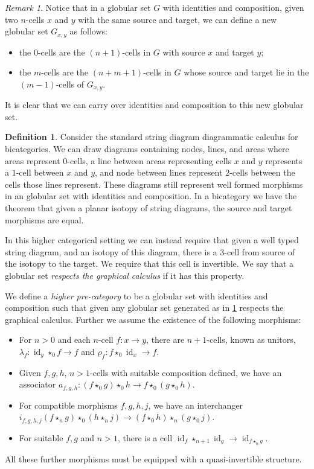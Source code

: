 \documentclass{article}
\theoremstyle{definition}
\newtheorem{definition}{Definition}
\theoremstyle{remark}
\newtheorem{remark}{Remark}
\DeclareMathOperator{\id}{id}
\newcommand{\comp}{\star}
\begin{document}
\begin{remark}\label{descendants}
  Notice that in a globular set \(G\) with identities and composition, given two \(n\)-cells \(x\) and \(y\) with the same source and target, we can define a new globular set \(G_{x,y}\) as follows:
  \begin{itemize}
  \item the \(0\)-cells are the \((n+1)\)-cells in \(G\) with source \(x\) and target \(y\);
  \item the \(m\)-cells are the \((n+m+1)\)-cells in \(G\) whose source and target lie in the \((m-1)\)-cells of \(G_{x,y}\).
  \end{itemize}
  It is clear that we can carry over identities and composition to this new globular set.
\end{remark}

\begin{definition}\label{def:higher-cat}
  Consider the standard string diagram diagrammatic calculus for bicategories. We can draw diagrams containing nodes, lines, and areas where areas represent \(0\)-cells, a line between areas representing cells \(x\) and \(y\) represents a \(1\)-cell between \(x\) and \(y\), and node between lines represent \(2\)-cells between the cells those lines represent. These diagrams still represent well formed morphisms in an globular set with identities and composition. In a bicategory we have the theorem that given a planar isotopy of string diagrams, the source and target morphisms are equal.

  In this higher categorical setting we can instead require that given a well typed string diagram, and an isotopy of this diagram, there is a \(3\)-cell from source of the isotopy to the target. We require that this cell is invertible. We say that a globular set \emph{respects the graphical calculus} if it has this property.

  We define a \emph{higher pre-category} to be a globular set with identities and composition such that given any globular set generated as in \cref{descendants} respects the graphical calculus. Further we assume the existence of the following morphisms:
  \begin{itemize}
  \item For \(n>0\) and each \(n\)-cell \(f: x \to y\), there are \(n+1\)-cells, known as unitors, \(\lambda_f: \id_y \comp_0 f \to f\) and \(\rho_f: f \comp_0 \id_x \to f\).
  \item Given \(f,g,h\), \(n>1\)-cells with suitable composition defined, we have an associator \(a_{f,g,h} : (f \comp_0 g) \comp_0 h \to f \comp_0 (g \comp_0 h)\).
  \item For compatible morphisms \(f,g,h,j\), we have an interchanger \(i_{f,g,h,j}(f \comp_n g) \comp_0 (h \comp_n j) \to (f \comp_0 h) \comp_n (g \comp_0 j)\).
  \item For suitable \(f,g\) and \(n > 1\), there is a cell \(\id_f \comp_{n+1} \id_g \to \id_{f \comp_n g}\).
  \end{itemize}
  All these further morphisms must be equipped with a quasi-invertible structure.
\end{definition}
\end{document}
